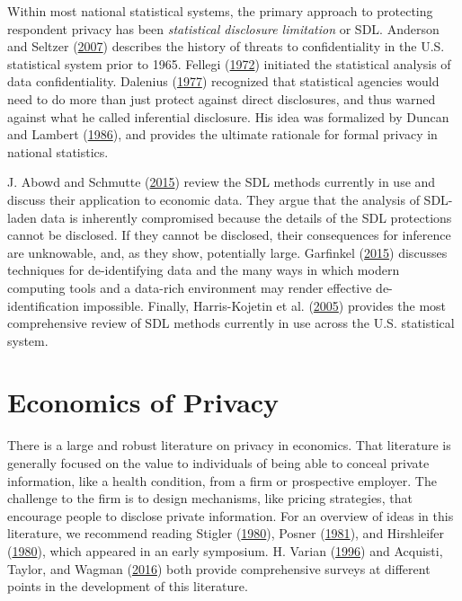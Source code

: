 \documentclass[]{article}
\begin{document}
Within most national statistical systems, the primary approach to
protecting respondent privacy has been \emph{statistical disclosure
limitation} or SDL. Anderson and Seltzer
(\protect\hyperlink{ref-anderson:challenges:JOS:2007}{2007}) describes
the history of threats to confidentiality in the U.S. statistical system
prior to 1965. Fellegi (\protect\hyperlink{ref-Fellegi:1972}{1972})
initiated the statistical analysis of data confidentiality. Dalenius
(\protect\hyperlink{ref-Dalenius:Towards:1977}{1977}) recognized that
statistical agencies would need to do more than just protect against
direct disclosures, and thus warned against what he called inferential
disclosure. His idea was formalized by Duncan and Lambert
(\protect\hyperlink{ref-Duncan:Lambert:1986}{1986}), and provides the
ultimate rationale for formal privacy in national statistics.

J. Abowd and Schmutte
(\protect\hyperlink{ref-abowdschmutteBPEA2015}{2015}) review the SDL
methods currently in use and discuss their application to economic data.
They argue that the analysis of SDL-laden data is inherently compromised
because the details of the SDL protections cannot be disclosed. If they
cannot be disclosed, their consequences for inference are unknowable,
and, as they show, potentially large. Garfinkel
(\protect\hyperlink{ref-Garfinkel:Deidentification:NIST:2015}{2015})
discusses techniques for de-identifying data and the many ways in which
modern computing tools and a data-rich environment may render effective
de-identification impossible. Finally, Harris-Kojetin et al.
(\protect\hyperlink{ref-spwp22}{2005}) provides the most comprehensive
review of SDL methods currently in use across the U.S. statistical
system.

\hypertarget{economics-of-privacy}{\section{Economics of
Privacy}\label{economics-of-privacy}}

There is a large and robust literature on privacy in economics. That
literature is generally focused on the value to individuals of being
able to conceal private information, like a health condition, from a
firm or prospective employer. The challenge to the firm is to design
mechanisms, like pricing strategies, that encourage people to disclose
private information. For an overview of ideas in this literature, we
recommend reading Stigler
(\protect\hyperlink{ref-stigler1980introduction}{1980}), Posner
(\protect\hyperlink{ref-posner1981economics}{1981}), and Hirshleifer
(\protect\hyperlink{ref-hirshleifer1980privacy}{1980}), which appeared
in an early symposium. H. Varian
(\protect\hyperlink{ref-Varian1996}{1996}) and Acquisti, Taylor, and
Wagman (\protect\hyperlink{ref-acquisti:taylor:wagman:2015}{2016}) both
provide comprehensive surveys at different points in the development of
this literature.
\end{document}
